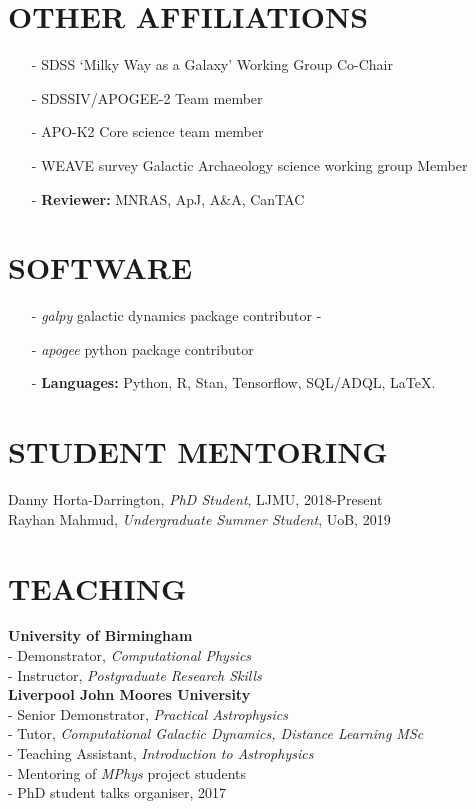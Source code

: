 \documentclass[margin]{res}
\begin{document}
\begin{resume}
\section{OTHER AFFILIATIONS}
\begin{itemize}
\item[-] SDSS `Milky Way as a Galaxy' Working Group Co-Chair 
\item[-] SDSSIV/APOGEE-2 Team member
\item[-] APO-K2 Core science team member
\item[-] WEAVE survey Galactic Archaeology science working group Member
\item[-] \textbf{Reviewer:} MNRAS, ApJ, A\&A, CanTAC
\end{itemize}

\section{SOFTWARE}
\begin{itemize}
\item[-] \emph{galpy} galactic dynamics package contributor
-\item[-] \emph{apogee} python package contributor
\item[-] \textbf{Languages:} Python, R, Stan, Tensorflow, SQL/ADQL, \LaTeX.
\end{itemize}

\section{STUDENT MENTORING}
Danny Horta-Darrington, \emph{PhD Student}, LJMU, 2018-Present\\
Rayhan Mahmud, \emph{Undergraduate Summer Student}, UoB, 2019


\section{TEACHING}
\textbf{University of Birmingham}\\
- Demonstrator, \emph{Computational Physics}\\
- Instructor, \emph{Postgraduate Research Skills}\\
\textbf{Liverpool John Moores University}\\
- Senior Demonstrator, \emph{Practical Astrophysics}\\
- Tutor, \emph{Computational Galactic Dynamics, Distance Learning MSc}\\
- Teaching Assistant, \emph{Introduction to Astrophysics}\\
- Mentoring of \emph{MPhys} project students\\
- PhD student talks organiser, 2017


\end{resume}
\end{document}
